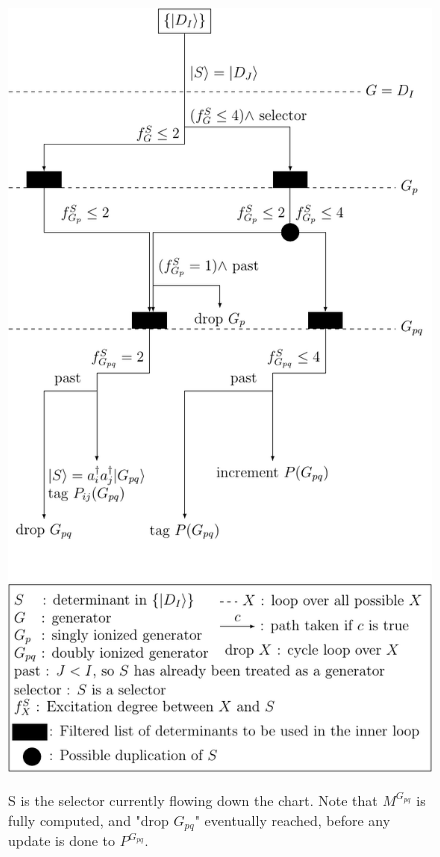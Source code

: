 \begin{figure}[h!]
	\begin{center}
		\includegraphics[width=1.00\columnwidth]{figures/cipsi/selection}
		\caption{\label{fig:selection}}
		S is the selector currently flowing down the chart.
		Note that $M^{G_{pq}}$ is fully computed, and "drop $G_{pq}$" eventually reached, before any update is done to $P^{G_{pq}}$.
		
	\end{center}
\end{figure}

